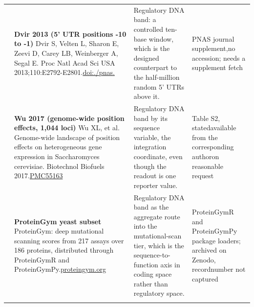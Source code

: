 \begin{landscape}
\begin{longtable}{@{}r@{\hspace{4pt}} L{78mm} L{72mm} L{76mm}@{}}
 & \textbf{Dvir 2013 (5' UTR positions -10 to -1)} \newline Dvir S, Velten L, Sharon E, Zeevi D, Carey LB, Weinberger A, Segal E. Proc Natl Acad Sci USA 2013;110:E2792-E2801.\newline \href{https://doi.org/10.1073/pnas.1222534110}{doi:./\allowbreak pnas.} & Regulatory DNA band: a controlled ten-base window, which is the designed counterpart to the half-million random 5' UTRs above it. & PNAS jou\allowbreak rnal sup\allowbreak plement,\allowbreak  no acce\allowbreak ssion; n\allowbreak eeds a s\allowbreak upplemen\allowbreak t fetch \\
 & \textbf{Wu 2017 (genome-wide position effects, 1,044 loci)} \newline Wu XL, et al. Genome-wide landscape of position effects on heterogeneous gene expression in Saccharomyces cerevisiae. Biotechnol Biofuels 2017.\newline \href{https://www.ncbi.nlm.nih.gov/pmc/articles/PMC5516366/}{PMC55163} & Regulatory DNA band by its sequence variable, the integration coordinate, even though the readout is one reporter value. & Table S2\allowbreak , stated\allowbreak  availab\allowbreak le from \allowbreak the corr\allowbreak espondin\allowbreak g author\allowbreak  on reas\allowbreak onable r\allowbreak equest \\
 & \textbf{ProteinGym yeast subset} \newline ProteinGym: deep mutational scanning scores from 217 assays over 186 proteins, distributed through ProteinGymR and ProteinGymPy.\newline \href{https://proteingym.org}{proteing\allowbreak ym.\allowbreak org} & Regulatory DNA band as the aggregate route into the mutational-scan tier, which is the sequence-to-function axis in coding space rather than regulatory space. & ProteinG\allowbreak ymR and \allowbreak ProteinG\allowbreak ymPy pac\allowbreak kage loa\allowbreak ders; ar\allowbreak chived o\allowbreak n Zenodo\allowbreak , record\allowbreak  number \allowbreak not capt\allowbreak ured \\
\addlinespace[5pt]

\end{longtable}
\end{landscape}
